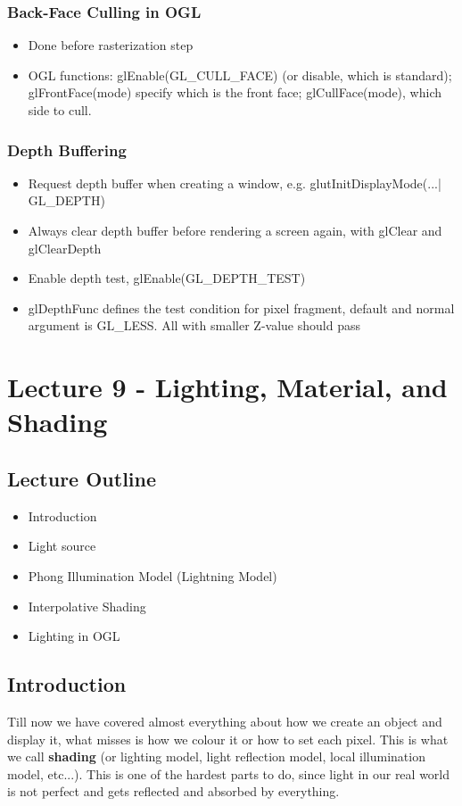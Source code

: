 \documentclass[11pt]{article}
\begin{document}
\subsubsection*{Back-Face Culling in OGL}
\begin{itemize}
    \item Done before rasterization step
    \item OGL functions: glEnable(GL\_CULL\_FACE) (or disable, which is standard); glFrontFace(mode) specify which is the front face; glCullFace(mode), which side to cull.
\end{itemize}

\subsubsection*{Depth Buffering}
\begin{itemize}
    \item Request depth buffer when creating a window, e.g. glutInitDisplayMode(...| GL\_DEPTH)
    \item Always clear depth buffer before rendering a screen again, with glClear and glClearDepth
    \item Enable depth test, glEnable(GL\_DEPTH\_TEST)
    \item glDepthFunc defines the test condition for pixel fragment, default and normal argument is GL\_LESS. All with smaller Z-value should pass
\end{itemize}


\section{Lecture 9 - Lighting, Material, and Shading}
\subsection*{Lecture Outline}
\begin{itemize}
    \item Introduction
    \item Light source
    \item Phong Illumination Model (Lightning Model)
    \item Interpolative Shading
    \item Lighting in OGL
\end{itemize}


\subsection{Introduction}
Till now we have covered almost everything about how we create an object and display it, what misses is how we colour it or how to set each pixel. This is what we call \textbf{shading} (or lighting model, light reflection model, local illumination model, etc...).
This is one of the hardest parts to do, since light in our real world is not perfect and gets reflected and absorbed by everything.  
\end{document}
